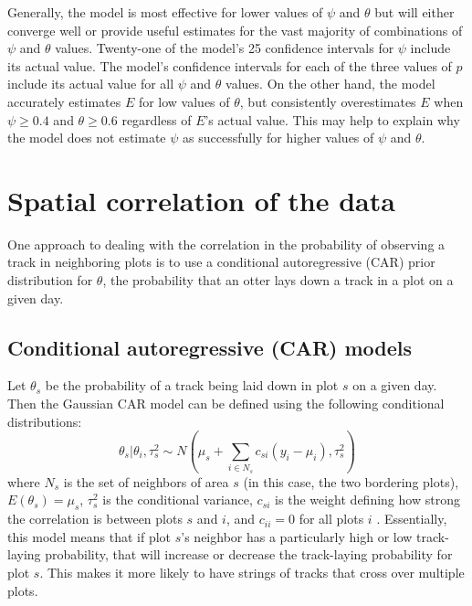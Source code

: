 \documentclass[12pt]{article}
\begin{document}
    Generally, the model is most effective for lower values of \(\psi\) and
    \(\theta\) but will either converge well or provide useful estimates for the
    vast majority of combinations of \(\psi\) and \(\theta\) values. Twenty-one
    of the
    model's 25 confidence intervals for \(\psi\) include its actual value.
    The model's confidence intervals for each of the
    three values of \(p\) include its actual value for all \(\psi\) and
    \(\theta\) values. On the other hand, the model accurately estimates \(E\)
    for low values of \(\theta\), but consistently overestimates \(E\) when
    \(\psi\geq0.4\) and \(\theta\geq0.6\) regardless of \(E\)'s actual value.
    This may help to explain why the model does not estimate \(\psi\) as
    successfully for higher values of \(\psi\) and \(\theta\).

\section{Spatial correlation of the data}
One approach to dealing with the correlation in the probability of
observing a track in neighboring plots is to use a conditional autoregressive
(CAR) prior distribution for $\theta$, the probability that an otter lays down a
track in a plot on a given day.

    \subsection{Conditional autoregressive (CAR) models}
    Let $\theta_s$ be the probability of a track being laid down in plot $s$ on
    a given day. Then the Gaussian CAR model can be defined using the following
    conditional distributions:
    \begin{equation}
        \theta_s|\theta_i,\tau_s^2 \sim N(\mu_s+\sum_{i\in N_s}
        c_{si}(y_i-\mu_i),\tau_s^2)
    \end{equation}
    where $N_s$ is the set of neighbors of area $s$ (in this case, the two
    bordering plots), $E(\theta_s)=\mu_s$, $\tau_s^2$ is the conditional
    variance, $c_{si}$ is the weight defining how strong the correlation is
    between plots $s$ and $i$, and $c_{ii}=0$ for all plots $i$ \cite{Arab2008}.
    Essentially, this model means that if plot $s$'s neighbor has a
    particularly high or low track-laying probability, that will increase or
    decrease the track-laying probability for plot $s$. This makes it more
    likely to have strings of tracks that cross over multiple plots.
\end{document}
